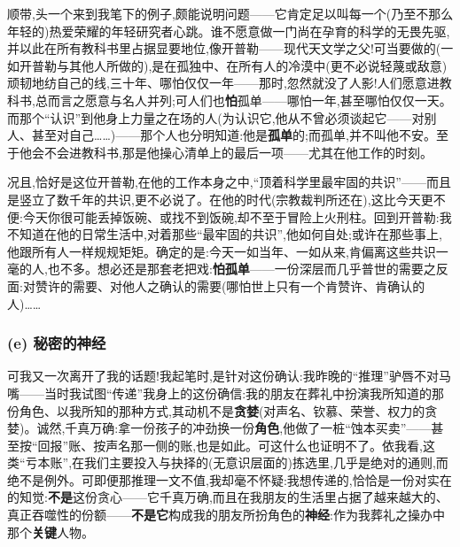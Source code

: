 顺带,头一个来到我笔下的例子,颇能说明问题——它肯定足以叫每一个(乃至不那么年轻的)热爱荣耀的年轻研究者心跳。谁不愿意做一门尚在孕育的科学的无畏先驱,并以此在所有教科书里占据显要地位,像开普勒——现代天文学之父!可当要做的(一如开普勒与其他人所做的),是在孤独中、在所有人的冷漠中(更不必说轻蔑或敌意)顽韧地纺自己的线,三十年、哪怕仅仅一年——那时,忽然就没了人影!人们愿意进教科书,总而言之愿意与名人并列;可人们也\textbf{怕}孤单——哪怕一年,甚至哪怕\dmark{}仅仅一天。而那个“认识”到他身上力量之在场的人(为认识它,他从不曾必须谈起它——对别人、甚至对自己……)——那个人也分明知道:他是\textbf{孤单}的;而孤单,并不叫他不安。至于他会不会进教科书,那是他操心清单上的最后一项——尤其在他工作的时刻。

况且,恰好是这位开普勒,在他的工作本身之中,“顶着科学里最牢固的共识”——而且是竖立了数千年的共识,更不必说了。在他的时代(宗教裁判所还在),这比今天更不便:今天你很可能丢掉饭碗、或找不到饭碗,却不至于冒险上火刑柱。回到开普勒:我不知道在他的日常生活中,对着那些“最牢固的共识”,他如何自处;或许在那些事上,他跟所有人一样规规矩矩。确定的是:今天一如当年、一如从来,肯偏离这些共识一毫的人,也不多。想必还是那套老把戏:\textbf{怕孤单}——一份深层而几乎普世的需要之反面:对赞许的需要、对他人之确认的需要(哪怕世上只有一个肯赞许、肯确认的人)……

\subsubsection*{(e) 秘密的神经}
\label{ch18:local:h58}

\label{ch18:local:n53}

可我又一次离开了我的话题!我起笔时,是针对这份确认:我昨晚的“推理”驴唇不对马嘴——当时我试图“传递”我身上的这份确信:我的朋友在葬礼中扮演我所知道的那份角色、以我所知的那种方式,其动机不是\textbf{贪婪}(对声名、钦慕、荣誉、权力的贪婪)。诚然,千真万确:拿一份孩子的冲劲换一份\textbf{角色},他做了一桩“蚀本买卖”——甚至按“回报”账、按声名那一侧的账,也是如此。可这什么也证明不了。依我看,这类“亏本账”,在我们主要\dmark{}投入与抉择的(无意识层面的)拣选里,几乎是绝对的通则,而绝不是例外。可即便那推理一文不值,我却毫不怀疑:我想传递的,恰恰是一份对实在的知觉:\textbf{不是}这份贪心——它千真万确,而且在我朋友的生活里占据了越来越大的、真正吞噬性的份额——\textbf{不是它}构成我的朋友所扮角色的\textbf{神经}:作为我葬礼之操办中那个\textbf{关键}人物。

